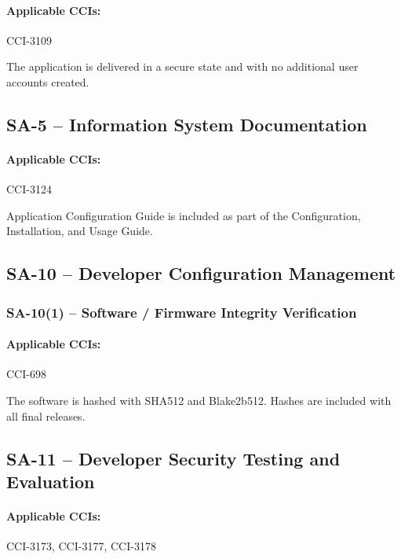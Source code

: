 \documentclass[letterpaper, 10pt, twoside]{article}
\begin{document}
\paragraph{Applicable CCIs:} CCI-3109

The application is delivered in a secure state and with no additional user accounts created.

\subsection{SA-5 -- Information System Documentation}

\paragraph{Applicable CCIs:} CCI-3124

Application Configuration Guide is included as part of the Configuration, Installation, and Usage Guide.

\subsection{SA-10 -- Developer Configuration Management}

\subsubsection{SA-10(1) -- Software / Firmware Integrity Verification}

\paragraph{Applicable CCIs:} CCI-698

The software is hashed with SHA512 and Blake2b512. Hashes are included with all final releases.

\subsection{SA-11 -- Developer Security Testing and Evaluation}
\label{sec:sa-11}

\paragraph{Applicable CCIs:} CCI-3173, CCI-3177, CCI-3178
\end{document}
